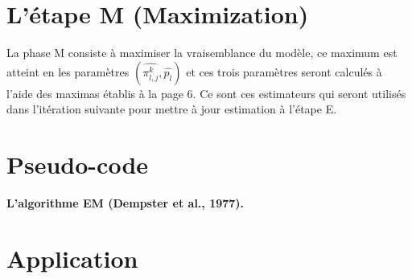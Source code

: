 \documentclass[frenchb]{report}
\newcommand{\1}{\mathbbm{1}}
\theoremstyle{definition}\newtheorem{defn}{Définition}
\theoremstyle{definition}\newtheorem{exm}{Exemple}
\theoremstyle{definition}\newtheorem{nota}{Notation}
\theoremstyle{definition}\newtheorem{rem}{Remarque}
\begin{document}
\section{L'étape M (Maximization)}

La phase M consiste à maximiser la vraisemblance du modèle, ce maximum est atteint en les paramètres $\left(\widehat{\pi^k_{l,j}}, \widehat{p_l} \right)$ et ces trois paramètres seront calculés à l'aide des maximas établis à la page $6$. Ce sont ces estimateurs qui seront utilisés dans l'itération suivante pour mettre à jour estimation à l'étape E.

\section{Pseudo-code}

\begin{algorithm}
	\caption{\textbf{L’algorithme EM (Dempster et al., 1977).}}
	\begin{algorithmic}[1]
		\ENDFOR
	\end{algorithmic}
\end{algorithm}

\newpage

\section{Application}
\end{document}
